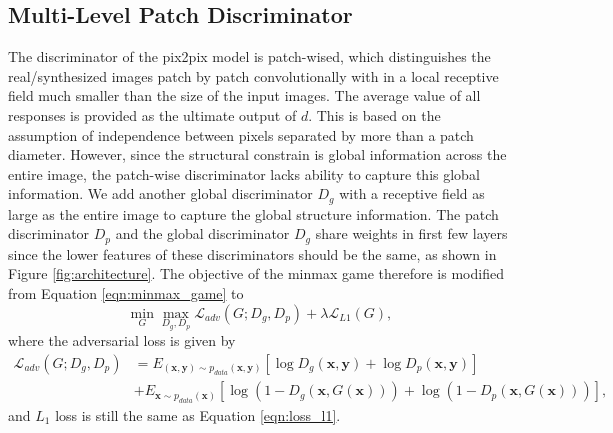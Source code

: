 \subsection{Multi-Level Patch Discriminator}
\label{subsec:disciminator}
The discriminator of the pix2pix model is patch-wised, which distinguishes the real/synthesized images patch by patch convolutionally with in a local receptive field much smaller than the size of the input images. 
The average value of all responses is provided as the ultimate output of $d$. 
This is based on the assumption of independence between pixels separated by more than a patch diameter. 
However, since the structural constrain is global information across the entire image, the patch-wise discriminator lacks ability to capture this global information.
We add another global discriminator $D_g$ with a receptive field as large as the entire image to capture the global structure information. The patch discriminator $D_p$ and the global discriminator $D_g$ share weights in first few layers since the lower features of these discriminators should be the same, as shown in Figure \ref{fig:architecture}. The objective of the minmax game therefore is modified from Equation \ref{eqn:minmax_game} to
\begin{equation}
\label{eqn:new_minmax_game}
\min_G \max_{D_g, D_p} \mathcal{L}_{adv}(G;D_g,D_p)+\lambda \mathcal{L}_{L1}(G),
\end{equation}
where the adversarial loss is given by 
\begin{equation}
\label{eqn:new_loss_adv}
	\begin{aligned}
	\mathcal{L}_{adv}(G;D_g,D_p)&=E_{(\bm{x},\bm{y})\sim p_{data}(\bm{x},\bm{y})}[\log D_g(\bm{x},\bm{y})+\log D_p(\bm{x},\bm{y})] \\
	&+E_{\bm{x}\sim p_{data}(\bm{x})}[\log(1-D_g(\bm{x},G(\bm{x})))+\log(1-D_p(\bm{x},G(\bm{x})))],
	\end{aligned}
\end{equation}
and $L_1$ loss is still the same as Equation \ref{eqn:loss_l1}.
%
%
